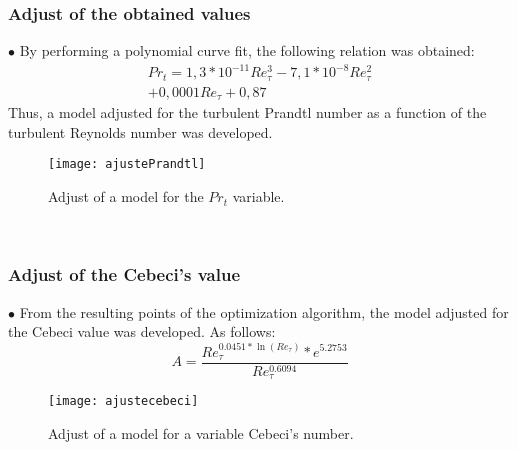 \documentclass[xcolor=dvipsnames,8pt,aspectratio=34]{beamer}
\begin{document}
	
	
	
	
		\begin{frame}
		\frametitle{Adjust of the obtained values}
		\begin{minipage}[h!]{0.48\textwidth}
			$\bullet$ By performing a polynomial curve fit, the following relation was obtained:
			\begin{equation}
			\begin{split}
			Pr_t = 1,3 * 10^{-11} Re_\tau^3 - 7,1 * 10^{-8} Re_\tau^2 \\ + 0,0001 Re_\tau + 0,87 
			\end{split}
			\end{equation}
			Thus, a model adjusted for the turbulent Prandtl number as a function of the turbulent Reynolds number was developed.
		\end{minipage}
		\begin{minipage}[h!]{0.45\textwidth}
			\begin{figure}
				\centering
				\texttt{[image: ajustePrandtl]}
				\caption{Adjust of a model for the $ Pr_t $ variable.}
			\end{figure}
		\end{minipage}\\
		\end{frame}	
	
	
	
	
	
		\begin{frame}
		\frametitle{Adjust of the Cebeci's value}
		\begin{minipage}[h!]{0.45\textwidth}
			$\bullet$ From the resulting points of the optimization algorithm, the model adjusted for the Cebeci value was developed. As follows:
			\begin{equation}
			A = \frac{Re_\tau ^{0.0451 * \ln(Re_\tau)} *e ^ {5.2753} }{Re_\tau ^{0.6094}}
			\end{equation}
		\end{minipage}
		\begin{minipage}[h!]{0.51\textwidth}
			\begin{figure}
				\centering
				\texttt{[image: ajustecebeci]}
				\caption{Adjust of a model for a variable Cebeci's number.}
			\end{figure}
		\end{minipage}
		\end{frame}	
	
	
	
	
	
\end{document}
